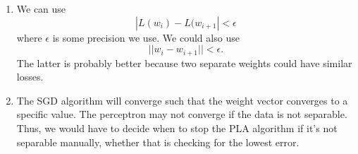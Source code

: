 \documentclass[12pt]{article}
\begin{document}
\begin{enumerate}[leftmargin=*]
\begin{enumerate}[label = \Alph*.]
\item We can use
\[ |L(w_i) - L(w_{i + 1}| < \epsilon \]
where $\epsilon$ is some precision we use. We could also use
\[ ||w_i - w_{i + 1}|| < \epsilon. \]
The latter is probably better because two separate weights could have similar losses.
\item The SGD algorithm will converge such that the weight vector converges to a specific value. The perceptron may not converge if the data is not separable. Thus, we would have to decide when to stop the PLA algorithm if it's not separable manually, whether that is checking for the lowest error.
\end{enumerate}
\end{enumerate}
\end{document}

